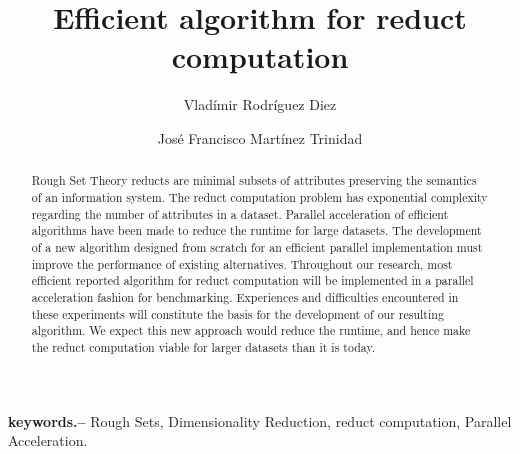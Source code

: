 \documentclass[11pt,authoryear]{elsarticle}
\begin{document}
\title{Efficient algorithm for reduct computation}
\author{Vlad\'imir Rodr\'iguez Diez \and Jos\'e Francisco Mart\'inez Trinidad
 }


\begin{abstract}
    Rough Set Theory reducts are minimal subsets of attributes preserving the semantics of an 
    information system. The reduct computation problem has exponential complexity regarding the number of 
    attributes in a dataset. Parallel acceleration of efficient algorithms have been made to
    reduce the runtime for large datasets. The development of a new algorithm designed from scratch
    for an efficient parallel implementation must improve the performance of existing alternatives. 
    Throughout our research, most efficient reported algorithm for reduct computation will be 
    implemented in a parallel acceleration fashion for benchmarking. Experiences and difficulties 
    encountered in these experiments will constitute the basis for the development of our resulting algorithm. 
    We expect this new approach would reduce the runtime, and hence make the reduct computation viable for 
    larger datasets than it is today.
\end{abstract}

\textbf{keywords.--} Rough Sets, Dimensionality Reduction, reduct computation, Parallel Acceleration.

\pagebreak 
\tableofcontents
\pagebreak 

\end{document}
